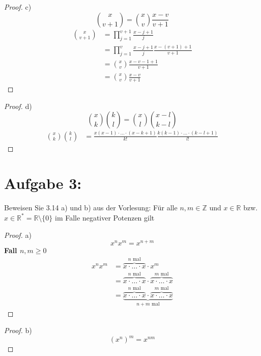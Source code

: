 \documentclass{exam}
\begin{document}
\begin{proof}
	c)
	\begin{displaymath}
		\binom{x}{v+1} = \binom{x}{v}\frac{x-v}{v+1}
	\end{displaymath}
	\begin{align}
		\binom{x}{v+1} & = \prod_{j=1}^{v+1}\frac{x-j+1}{j}                    \\
		               & = \prod_{j=1}^{v}\frac{x-j+1}{j}\frac{x-(v+1)+1}{v+1} \\
		               & = \binom{x}{v}\frac{x-v-1+1}{v+1}                     \\
		               & = \binom{x}{v}\frac{x-v}{v+1}
	\end{align}
\end{proof}
\begin{proof}
	d)
	\begin{displaymath}
		\binom{x}{k}\binom{k}{l} = \binom{x}{l}\binom{x-l}{k-l}
	\end{displaymath}
	\begin{align}
		\binom{x}{k}\binom{k}{l} & = \frac{x(x-1)\cdot\ldots\cdot(x-k+1)}{k!}\frac{k(k-1)\cdot\ldots\cdot(k-l+1)}{l!}
	\end{align}
\end{proof}

\section*{Aufgabe 3:}
Beweisen Sie 3.14 a) und b) aus der Vorlesung:
\newline\newline
Für alle $n,m \in \mathbb{Z}$ und $x \in \mathbb{R}$ bzw. $x \in \mathbb{R}^* = \mathbb{R}\setminus\{0\}$ im Falle negativer Potenzen gilt
\begin{proof}
	a)
	\begin{displaymath}
		x^nx^m = x^{n+m}
	\end{displaymath}
	\textbf{Fall $n,m \ge 0$}
	\begin{align}
		x^nx^m & = \overbrace{x \cdot\ldots\cdot x}^{n\text{ mal}} \cdot x^m                                                                           \\
		       & = \overbrace{x \cdot\ldots\cdot x}^{n\text{ mal}} \cdot \overbrace{x \cdot\ldots\cdot x}^{m\text{ mal}}                               \\
		       & = \underbrace{\overbrace{x \cdot\ldots\cdot x}^{n\text{ mal}} \cdot \overbrace{x \cdot\ldots\cdot x}^{m\text{ mal}}}_{n+m\text{ mal}}
	\end{align}
\end{proof}
\begin{proof}
	b)
	\begin{displaymath}
		{(x^n)}^m = x^{nm}
	\end{displaymath}
\end{proof}
\end{document}
